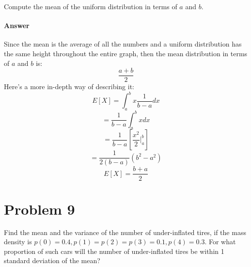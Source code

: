 \documentclass{article}
\begin{document}
	Compute the mean of the uniform distribution in terms of $a$ and $b$.

	\paragraph{Answer} Since the mean is the average of all the numbers and a uniform distribution 
	has the same height throughout the entire graph, then the mean distribution in terms of $a$ and 
	$b$ is: 
	\begin{displaymath}
		\frac{a+b}{2}
	\end{displaymath}
	Here's a more in-depth way of describing it:
	\begin{displaymath}
		E[X] = \int_{a}^{b}x\frac{1}{b-a}dx
	\end{displaymath}
	\begin{displaymath}
		= \frac{1}{b-a}\int_{a}^{b}xdx
	\end{displaymath}
	\begin{displaymath}
		= \frac{1}{b-a}\left[\frac{x^2}{2}|_{a}^{b}\right]
	\end{displaymath}
	\begin{displaymath}
		= \frac{1}{2(b-a)}(b^2-a^2)
	\end{displaymath}
	\begin{displaymath}
		E[X] = \frac{b+a}{2}
	\end{displaymath}

\clearpage
\section*{Problem 9}

	Find the mean and the variance of the number of under-inflated tires, if the mass density is 
	$p(0) = 0.4, p(1) = p(2) = p(3) = 0.1, p(4) = 0.3$. For what proportion of such cars will the 
	number of under-inflated tires be within 1 standard deviation of the mean?
\end{document}
